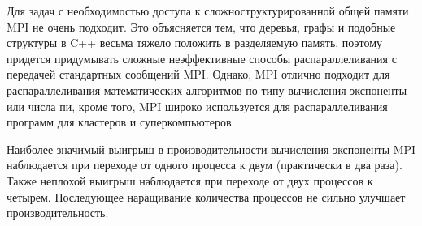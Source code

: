 \documentclass[14pt,a4paper,report]{report}
\begin{document}
Для задач с необходимостью доступа к сложноструктурированной общей памяти MPI не очень подходит. Это объясняется тем, что деревья, графы и подобные структуры в C++ весьма тяжело положить в разделяемую память, поэтому придется придумывать сложные неэффективные способы распараллеливания с передачей стандартных сообщений MPI. Однако, MPI отлично подходит для распараллеливания математических алгоритмов по типу вычисления экспоненты или числа пи, кроме того, MPI широко используется для распараллеливания программ для кластеров и суперкомпьютеров.

Наиболее значимый выигрыш в производительности вычисления экспоненты MPI наблюдается при переходе от одного процесса к двум (практически в два раза). Также неплохой выигрыш наблюдается при переходе от двух процессов к четырем. Последующее наращивание количества процессов не сильно улучшает производительность.



\end{document}
